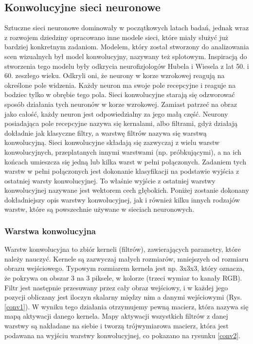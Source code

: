 \documentclass[a4paper,twoside,12pt]{book}
\begin{document}
{\subsection{Konwolucyjne sieci neuronowe}{Sztuczne sieci neuronowe dominowały w początkowych latach badań, jednak wraz z rozwojem dziedziny opracowano inne modele sieci, które miały służyć już bardziej konkretnym zadaniom. Modelem, który został stworzony do analizowania scen wizualnych był model konwolucyjny, nazywany też splotowym. }
{Inspiracją do stworzenia tego modelu były odkrycia neurofizjologów Hubela i Wiesela z lat 50. i 60. zeszłego wieku. \cite{hubel1959receptive}\cite{hubel1963shape}\cite{hubel1968receptive} Odkryli oni, że neurony w korze wzrokowej reagują na określone pole widzenia. Każdy neuron ma swoje pole recepcyjne i reaguje na bodziec tylko w obrębie tego pola. Sieci konwolucyjne starają się odzworować sposób działania tych neuronów w korze wzrokowej. Zamiast patrzeć na obraz jako całość, każdy neuron jest odpowiedzialny za jego małą część. Neurony posiadająca pole recepcyjne nazywa się kernalami, albo filtrami, gdyż działają dokładnie jak klasyczne filtry, a warstwę filtrów nazywa się warstwą konwolucyjną. Sieci konwolucyjne składają się zazwyczaj z wielu warstw konwolucyjnych, przeplatanych innymi warstwami (np. próbkującymi), a na ich końcach umieszcza się jedną lub kilka warst w pełni połączonych. Zadaniem tych warstw w pełni połączonych jest dokonanie klasyfikacji na podstawie wyjścia z ostatniej warsty konwolucyjnej. To właśnie wyjście z ostatniej warstwy konwolucyjnej nazywane jest wektorem cech głębokich. Poniżej zostanie dokonany dokładniejszy opis warstwy konwolucyjnej, jak i również kilku innych rodzajów warstw, które są powszechnie używane w sieciach neuronowych.}

\subsubsection{Warstwa konwolucyjna}
{Warstw konwolucyjna to zbiór kerneli (filtrów), zawierających parametry, które należy nauczyć. Kernele są zazwyczaj małych rozmiarów, mniejszych od rozmiaru obrazu wejściowego. Typowym rozmiarem kernela jest np. 3x3x3, który oznacza, że pokrywa on obszar 3 na 3 piksele, w kolorze (trzeci wymiar to kanały RGB). Filtr jest następnie przesuwany przez cały obraz wejściowy, i w każdej jego pozycji obliczany jest iloczyn skalarny między nim a danymi wejściowymi (Rys. \ref{conv1}). W wyniku tego działania otrzymujemy pewną macierz, która nazywa się mapą aktywacji danego kernela. Mapy aktywacji wszystkich filtrów z danej warstwy są nakładane na siebie i tworzą trójwymiarowa macierz, która jest podawana na wyjściu warstwy konwolucyjnej, co pokazano na rysunku \ref{conv2}.}

}
\end{document}
